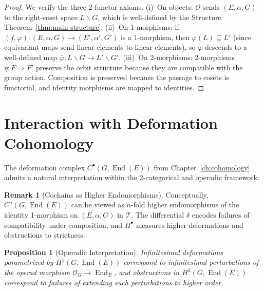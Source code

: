\documentclass[11pt,a4paper,openany]{book}
\theoremstyle{plain}
\newtheorem{proposition}[theorem]{Proposition}
\theoremstyle{definition}
\newtheorem{remark}[theorem]{Remark}
\newcommand{\lingroup}{L}
\newcommand{\actspace}{E}
\newcommand{\groupG}{G}
\DeclareMathOperator{\End}{End}
\begin{document}
\begin{proof}
We verify the three 2-functor axioms. (i)~On objects: $\mathcal{O}$ sends $(\actspace, \alpha, \groupG)$ to the right-coset space $\lingroup\backslash\groupG$, which is well-defined by the Structure Theorem~\ref{thm:main-structure}. (ii)~On 1-morphisms: if $(f, \varphi) : (\actspace, \alpha, \groupG) \to (\actspace', \alpha', \groupG')$ is a 1-morphism, then $\varphi(\lingroup) \subseteq \lingroup'$ (since equivariant maps send linear elements to linear elements), so $\varphi$ descends to a well-defined map $\bar{\varphi} : \lingroup\backslash\groupG \to \lingroup'\backslash\groupG'$. (iii)~On 2-morphisms: 2-morphisms $\eta : F \Rightarrow F'$ preserve the orbit structure because they are compatible with the group action. Composition is preserved because the passage to cosets is functorial, and identity morphisms are mapped to identities.
\end{proof}

\section{Interaction with Deformation Cohomology}

The deformation complex $C^\bullet(\groupG, \End(\actspace))$ from Chapter~\ref{ch:cohomology} admits a natural interpretation within the 2-categorical and operadic framework.

\begin{remark}[Cochains as Higher Endomorphisms]
Conceptually, $C^n(\groupG, \End(\actspace))$ can be viewed as $n$-fold higher endomorphisms of the identity 1-morphism on $(\actspace, \alpha, \groupG)$ in $\mathcal{T}$. The differential $\delta$ encodes failures of compatibility under composition, and $H^\bullet$ measures higher deformations and obstructions to strictness.
\end{remark}

\begin{proposition}[Operadic Interpretation]\label{prop:operadic-HH}
Infinitesimal deformations parametrized by $H^1(\groupG, \End(\actspace))$ correspond to infinitesimal perturbations of the operad morphism $\mathcal{O}_\groupG \to \End_\actspace$, and obstructions in $H^2(\groupG, \End(\actspace))$ correspond to failures of extending such perturbations to higher order.
\end{proposition}
\end{document}
